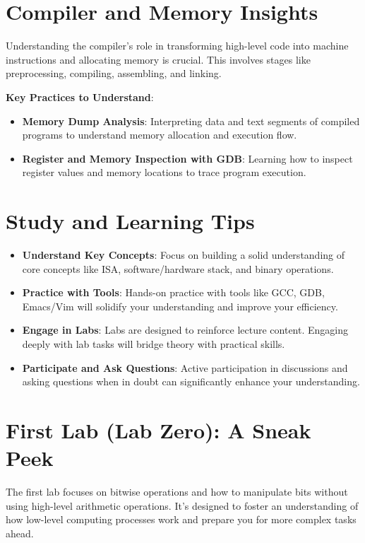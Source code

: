 \documentclass{article}
\begin{document}
\section{Compiler and Memory Insights}

Understanding the compiler's role in transforming high-level code into machine instructions and allocating memory is crucial. This involves stages like preprocessing, compiling, assembling, and linking.

\textbf{Key Practices to Understand}:

\begin{itemize}
    \item \textbf{Memory Dump Analysis}: Interpreting data and text segments of compiled programs to understand memory allocation and execution flow.
    \item \textbf{Register and Memory Inspection with GDB}: Learning how to inspect register values and memory locations to trace program execution.
\end{itemize}

\section{Study and Learning Tips}

\begin{itemize}
    \item \textbf{Understand Key Concepts}: Focus on building a solid understanding of core concepts like ISA, software/hardware stack, and binary operations.
    \item \textbf{Practice with Tools}: Hands-on practice with tools like GCC, GDB, Emacs/Vim will solidify your understanding and improve your efficiency.
    \item \textbf{Engage in Labs}: Labs are designed to reinforce lecture content. Engaging deeply with lab tasks will bridge theory with practical skills.
    \item \textbf{Participate and Ask Questions}: Active participation in discussions and asking questions when in doubt can significantly enhance your understanding.
\end{itemize}

\section{First Lab (Lab Zero): A Sneak Peek}

The first lab focuses on bitwise operations and how to manipulate bits without using high-level arithmetic operations. It's designed to foster an understanding of how low-level computing processes work and prepare you for more complex tasks ahead.
\end{document}

